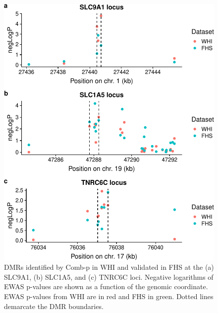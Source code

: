 \documentclass[]{bmcart}
\theoremstyle{definition}
\theoremstyle{definition}
\theoremstyle{definition}
\theoremstyle{remark}
\begin{document}
\begin{figure}[htbp]
\centering
\includegraphics{../doc/module_ewas/figures/print-combp-plots-1.pdf}
\caption{\label{fig:print-combp-plots}DMRs identified by Comb-p in WHI and
validated in FHS at the (a) SLC9A1, (b) SLC1A5, and (c) TNRC6C loci.
Negative logarithms of EWAS p-values are shown as a function of the
genomic coordinate. EWAS p-values from WHI are in red and FHS in green.
Dotted lines demarcate the DMR boundaries.}
\end{figure}
\end{document}
